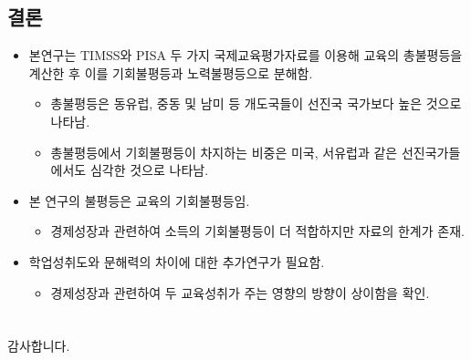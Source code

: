 \documentclass[aspectratio=169,xcolor=dvipsnames,handout]{beamer}
\begin{document}
\subsection{결론}
\begin{frame}
    \begin{itemize}
        \item 본연구는 TIMSS와 PISA 두 가지 국제교육평가자료를 이용해 교육의 총불평등을 계산한 후 이를 기회불평등과 노력불평등으로 분해함.
        \begin{itemize}
            \item 총불평등은 동유럽, 중동 및 남미 등 개도국들이 선진국 국가보다 높은 것으로 나타남.
            \item 총불평등에서 기회불평등이 차지하는 비중은 미국, 서유럽과 같은 선진국가들에서도 심각한 것으로 나타남.
        \end{itemize}
        \item 본 연구의 불평등은 교육의 기회불평등임. 
        \begin{itemize}
            \item 경제성장과 관련하여 소득의 기회불평등이 더 적합하지만 자료의 한계가 존재.
        \end{itemize}
        \item 학업성취도와 문해력의 차이에 대한 추가연구가 필요함.
        \begin{itemize}
            \item 경제성장과 관련하여 두 교육성취가 주는 영향의 방향이 상이함을 확인.
        \end{itemize}
    \end{itemize}
\end{frame}

\section*{}%
\begin{frame}
    \centering
    \huge
    감사합니다.
\end{frame}

\begin{frame}[allowframebreaks]
    
    
\end{frame}

\end{document}
